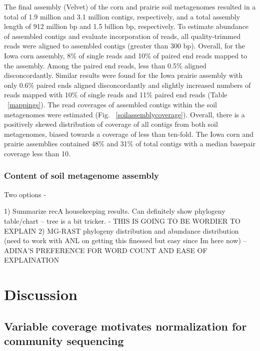 \documentclass[11pt]{article} %
\begin{document}
The final assembly (Velvet) of the corn and prairie soil metagenomes resulted in a total of 1.9 million and 3.1 million contigs, respectively, and a total assembly length of 912 million bp and 1.5 billion bp, respectively.  To estimate abundance of assembled contigs and evaluate incorporation of reads, all quality-trimmed reads were aligned to assembled contigs (greater than 300 bp).  Overall, for the Iowa corn assembly, 8\% of single reads and 10\% of paired end reads mapped to the assembly.  Among the paired end reads, less than 0.5\% aligned disconcordantly.  Similar results were found for the Iowa prairie assembly with only 0.6\% paired ends aligned disconcordantly and slightly increased numbers of reads mapped with 10\% of single reads and 11\% paired end reads (Table ~\ref{mappings}).  The read coverages of assembled contigs within the soil metagenomes were estimated (Fig. ~\ref{soilassemblycoverage}).  Overall, there is a positively skewed distribution of coverage of all contigs from both soil metagenomes, biased towards a coverage of less than ten-fold.  The Iowa corn and prairie assemblies contained 48\% and 31\% of total contigs with a median basepair coverage less than 10.  
	
\subsubsection{Content of soil metagenome assembly}

Two options - 

1) Summarize recA housekeeping results.  Can definitely show phylogeny table/chart -- tree is a bit tricker. - THIS IS GOING TO BE WORDIER TO EXPLAIN
2) MG-RAST phylogeny distribution and abundance distribution (need to work with ANL on getting this finessed but easy since Im here now) -- ADINA'S PREFERENCE FOR WORD COUNT AND EASE OF EXPLAINATION

\section{Discussion}

\subsection{Variable coverage motivates normalization for community sequencing} 
\end{document}
